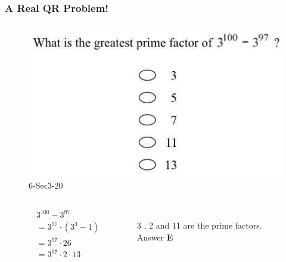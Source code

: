 \documentclass[
	11pt, %
	handout,
]{beamer}
\begin{document}

\begin{frame}
	\frametitle{A Real QR Problem!}
	\framesubtitle{}
	\begin{figure}
		\includegraphics[width=0.5\linewidth]{Prime_Factorization_Example_Question.png}
		\caption{6-Sec3-20}
	\end{figure}
	\pause

		\begin{columns}[t] %
		\begin{column}{0.45\textwidth} %
			\begin{equation*}
			\begin{aligned}
			&3^{100} - 3^{97} \\
			&= 3^{97} \cdot (3^3 - 1) \\
			&= 3^{97} \cdot 26\\&
			= 3^{97} \cdot 2 \cdot 13
			\end{aligned}
	\end{equation*}
		\end{column}
		\begin{column}{0.5\textwidth} %
		\\ 3 , 2 and 11 are the prime factors. \\
		\pause
		\bigskip
		Answer \textbf{E}
		\end{column}
	\end{columns}
\end{frame}

\end{document}
